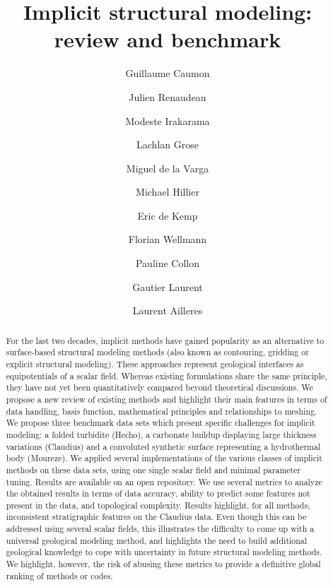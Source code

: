 \documentclass[preprint]{ring20}
\title{Implicit structural modeling: review and benchmark}
\author[1]{Guillaume Caumon}
\author[1,2]{Julien Renaudeau}
\author[1]{Modeste Irakarama}
\author[3]{Lachlan Grose}
\author[5]{Miguel de la Varga}
\author[6]{Michael Hillier}
\author[6]{Eric de Kemp}
\author[5]{Florian Wellmann}
\author[1]{Pauline Collon}
\author[4]{Gautier Laurent}
\author[3]{Laurent Ailleres}
\affil[1]{RING, GeoRessources / ENSG, Universit\'e de Lorraine / CNRS, France}
\affil[2]{Schlumberger, France}
\affil[3]{Monash University, Australia}
\affil[4]{Univ. Orl\'eans, CNRS, BRGM, ISTO, France}
\affil[5]{RWTH Aachen, Germany}
\affil[6]{NRCan, Canada}
\begin{document}
\maketitle

\begin{abstract}

For the last two decades, implicit methods have gained popularity as 
an alternative to surface-based structural modeling methods (also known as 
contouring, gridding or explicit structural modeling). These approaches represent 
geological interfaces as equipotentials of a scalar field. 
Whereas existing formulations share the same principle, they have not yet been 
quantitatively compared beyond theoretical discussions. We propose a new review 
 of existing methods and highlight their main features in terms 
of data handling, basis function, mathematical principles and relationships to 
meshing. We propose three benchmark data sets which present specific 
challenges for implicit modeling: a folded turbidite (Hecho), a carbonate buildup 
displaying large thickness variations (Claudius) and a convoluted synthetic surface 
representing a hydrothermal body (Moureze). We applied several implementations of the 
various classes of implicit methods on these data sets, using one single scalar field and minimal parameter 
tuning. Results are available on an open repository. We use several metrics to analyze 
the obtained results in terms of data accuracy, ability to predict 
some features not present in the data, and topological complexity. 
Results highlight, for all methods, inconsistent stratigraphic features 
on the Claudius data. Even though this can be addressed using several scalar fields, 
this illustrates the difficulty to come up with a universal geological 
modeling method, and highlights the need to build additional geological 
knowledge to cope with uncertainty in future structural modeling methods.  
We highlight, however, the risk of abusing these metrics to provide a definitive 
global ranking of methods or codes. 

\end{abstract}



\end{document}
